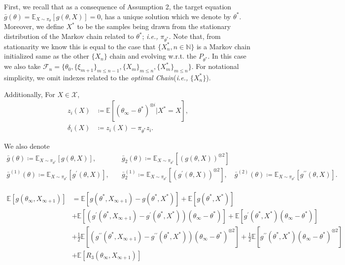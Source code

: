 \documentclass[a4paper]{article}
\newcommand{\Exs}{\mathbb{E}}
\newcommand{\thetastar}{\theta^*}
\newcommand{\thetainf}{\theta_\infty}
\newcommand{\xstar}{X^*}
\newcommand{\xinfPone}{X_{\infty + 1}}
\begin{document}
	First, we recall that as a consequence of Assumption 2, the target equation $\bar{g}\left(\theta\right) = \Exs_{X \sim \pi_{\theta}}\left[g\left(\theta, X\right)\right] = 0$, has a unique solution which we denote by $\thetastar$. Moreover, we define $\xstar$ to be the samples being drawn from the stationary distribution of the Markov chain related to $\thetastar$; \textit{i.e.,} $\pi_{\thetastar}$. Note that, from stationarity we know this is equal to the case that $\{X^{*}_{n}, n \in \mathbb{N}\}$ is a Markov chain initialized same as the other $\{X_{n}\}$ chain and evolving w.r.t. the $P_{\thetastar}$. In this case we also take $\mathcal{F}_{n} = \{\theta_{0}, \{\xi_{m + 1}\}_{m \leq n - 1}, \{X_{m}\}_{m \leq n}, \{X^{*}_{m}\}_{m \leq n} \}$. For notational simplicity, we omit indexes related to the \textit{optimal Chain}(\textit{i.e.,} $\{X^{*}_{n}\}$).
	
	Additionally, For $X \in \mathcal{X}$, 
	\begin{align*}
		z_{i}(X) & \coloneq \Exs\left[\left(\thetainf - \thetastar\right)^{\otimes i} | \xstar = X\right],\\
		\delta_{i}(X) & \coloneq z_{i}(X) - \pi_{\thetastar}z_{i}. 
	\end{align*}
	
	We also denote
	\begin{align*}
		\bar{g}\left(\theta\right) \coloneq \Exs_{X \sim \pi_{\thetastar}}\left[g\left(\theta, X\right)\right], \quad & \bar{g}_{2}\left(\theta\right) \coloneq \Exs_{X \sim \pi_{\thetastar}}\left[\left(g\left(\theta, X\right)\right)^{\otimes 2}\right]\\
		\bar{g}^{(1)}\left(\theta\right) \coloneq \Exs_{X \sim \pi_{\thetastar}}\left[g^{\prime}\left(\theta, X\right)\right], \quad & \bar{g}^{(1)}_{2} \coloneq \Exs_{X \sim \pi_{\thetastar}}\left[\left(g^{\prime}\left(\theta, X\right)\right)^{\otimes 2}\right], \quad \bar{g}^{(2)}\left(\theta\right) \coloneq \Exs_{X \sim \pi_{\thetastar}}\left[g^{\prime\prime}\left(\theta, X\right)\right].
	\end{align*}
	
	\begin{align*}
		\Exs\left[g\left(\thetainf, \xinfPone\right)\right] &=  \Exs\left[g\left(\thetastar, \xinfPone\right) - g\left(\thetastar, \xstar\right)\right] + \Exs\left[g\left(\thetastar, \xstar\right)\right] \\
		& + \Exs\left[\left(g^{\prime}\left(\thetastar, \xinfPone\right) - g^{\prime}\left(\thetastar, \xstar\right)\right)\left(\thetainf - \thetastar\right)\right] + \Exs\left[g^{\prime}\left(\thetastar, \xstar\right)\left(\thetainf - \thetastar\right)\right]\\
		& + \frac{1}{2}\Exs\left[\left(g^{\prime\prime}\left(\thetastar, \xinfPone\right) - g^{\prime\prime}\left(\thetastar, \xstar\right)\right)\left(\thetainf - \thetastar\right)^{\otimes 2}\right] + \frac{1}{2}\Exs\left[g^{\prime\prime}\left(\thetastar, \xstar\right)\left(\thetainf - \thetastar\right)^{\otimes 2}\right]\\
		& + \Exs\left[R_{3}\left(\thetainf, \xinfPone\right)\right]
	\end{align*}
	 
\end{document}
